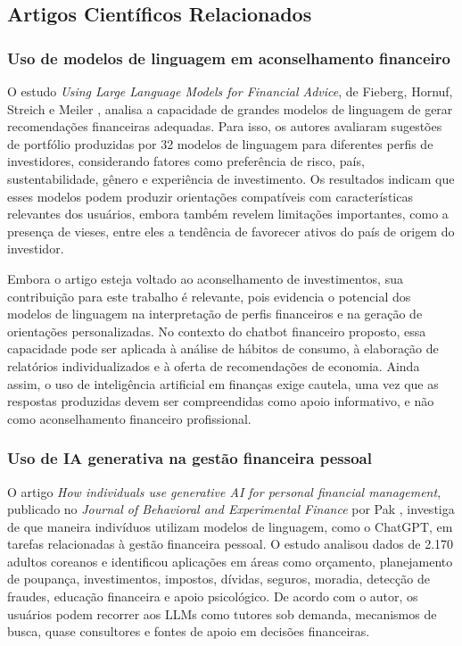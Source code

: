\subsection{Artigos Científicos Relacionados}

\subsubsection{Uso de modelos de linguagem em aconselhamento financeiro}

O estudo \textit{Using Large Language Models for Financial Advice}, de Fieberg, Hornuf, Streich e Meiler \cite{fieberg2024financialadvice}, analisa a capacidade de grandes modelos de linguagem de gerar recomendações financeiras adequadas. Para isso, os autores avaliaram sugestões de portfólio produzidas por 32 modelos de linguagem para diferentes perfis de investidores, considerando fatores como preferência de risco, país, sustentabilidade, gênero e experiência de investimento. Os resultados indicam que esses modelos podem produzir orientações compatíveis com características relevantes dos usuários, embora também revelem limitações importantes, como a presença de vieses, entre eles a tendência de favorecer ativos do país de origem do investidor.

Embora o artigo esteja voltado ao aconselhamento de investimentos, sua contribuição para este trabalho é relevante, pois evidencia o potencial dos modelos de linguagem na interpretação de perfis financeiros e na geração de orientações personalizadas. No contexto do chatbot financeiro proposto, essa capacidade pode ser aplicada à análise de hábitos de consumo, à elaboração de relatórios individualizados e à oferta de recomendações de economia. Ainda assim, o uso de inteligência artificial em finanças exige cautela, uma vez que as respostas produzidas devem ser compreendidas como apoio informativo, e não como aconselhamento financeiro profissional.

\subsubsection{Uso de IA generativa na gestão financeira pessoal}

O artigo \textit{How individuals use generative AI for personal financial management}, publicado no \textit{Journal of Behavioral and Experimental Finance} por Pak \cite{pak2026personalfinance}, investiga de que maneira indivíduos utilizam modelos de linguagem, como o ChatGPT, em tarefas relacionadas à gestão financeira pessoal. O estudo analisou dados de 2.170 adultos coreanos e identificou aplicações em áreas como orçamento, planejamento de poupança, investimentos, impostos, dívidas, seguros, moradia, detecção de fraudes, educação financeira e apoio psicológico. De acordo com o autor, os usuários podem recorrer aos LLMs como tutores sob demanda, mecanismos de busca, quase consultores e fontes de apoio em decisões financeiras.

